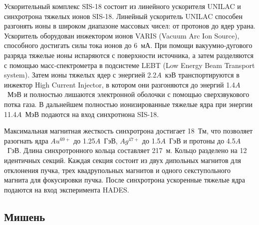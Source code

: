 Ускорительный комплекс SIS-18 состоит из линейного ускорителя UNILAC и синхротрона тяжелых ионов SIS-18.
Линейный ускоритель UNILAC способен разгонять ионы в широком диапазоне массовых чисел: от протонов до ядер урана.
Ускоритель оборудован инжектором ионов VARIS (Vacuum Arc Ion Source), способного достигать силы тока ионов до 6~мА.
При помощи вакуумно-дугового разряда тяжелые ионы испаряются с поверхности источника, а затем разделяются с помощью масс-спектрометра в подсистеме LEBT (Low Energy Beam Transport system).
Затем ионы тяжелых ядер с энергией 2.2$A$~кэВ транспортируются в инжектор High Current Injector, в котором они разгоняются до энергий 1.4$A$~МэВ и полностью лишаются электронной оболочки с помощью сверхзвукового потка газа.
В дальнейшем полностью ионизированные тяжелые ядра при энергии 11.4$A$~МэВ подаются на вход синхротнона SIS-18.

Максимальная магнитная жесткость синхротрона достигает 18~Тм, что позволяет разогнать ядра $Au^{69+}$ до 1.25$A$~ГэВ, $Ag^{47+}$ до 1.5$A$~ГэВ и протоны до 4.5$A$~ГэВ.
Длина синхротронного кольца составляет 217~м.
Кольцо разделено на 12 идентичных секций.
Каждая секция состоит из двух дипольных магнитов для отклонения пучка, трех квадрупольных магнитов и одного секступольного магнита для фокусировки пучка.
После синхротрона ускоренные тяжелые ядра подаются на вход эксперимента HADES.

\subsection{ Мишень }

